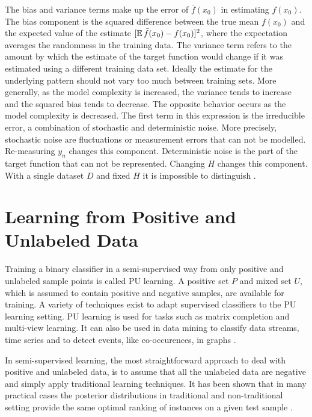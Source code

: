 The bias and variance terms make up the error of \(\bar{f}(x_0)\) in estimating \(f(x_0)\). The bias component is the squared difference between the true mean \(f(x_0)\) and the expected value of the estimate \([\operatorname{\mathbb{E}}\bar{f}(x_0) - f(x_0)]^2\), where the expectation averages the randomness in the training data. The variance term refers to the amount by which the estimate of the target function would change if it was estimated using a different training data set. Ideally the estimate for the underlying pattern should not vary too much between training sets. More generally, as the model complexity is increased, the variance tends to increase and the squared bias tends to decrease. The opposite behavior occurs as the model complexity is decreased. The first term in this expression is the irreducible error, a combination of stochastic and deterministic noise. More precisely, stochastic noise are fluctuations or measurement errors that can not be modelled. Re-measuring \(y_n\) changes this component. Deterministic noise is the part of the target function that can not be represented. Changing \(H\) changes this component. With a single dataset \(D\) and fixed \(H\) it is impossible to distinguish \cite{yaser}.  

\section{Learning from Positive and Unlabeled Data}

\vspace{0.4cm}

\vspace{0.4cm}

Training a binary classifier in a semi-supervised way from only positive and unlabeled sample points is called PU learning. A positive set \(P\) and mixed set \(U\), which is assumed to contain positive and negative samples, are available for training. A variety of techniques exist to adapt supervised classifiers to the PU learning setting. PU learning is used for tasks such as matrix completion and multi-view learning. It can also be used in data mining to classify data streams, time series and to detect events, like co-occurences, in graphs \cite{elkan, claesen}. 

In semi-supervised learning, the most straightforward approach to deal with positive and unlabeled data, is to assume that all the unlabeled data are negative and simply apply traditional learning techniques. It has been shown that in many practical cases the posterior distributions in traditional and non-traditional setting provide the same optimal ranking of instances on a given test sample \cite{jain, claesen}.

